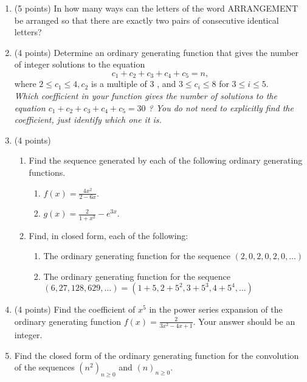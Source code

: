 \documentclass{article}
\begin{document}
\begin{enumerate}
  
  \item (5 points) In how many ways can the letters of the word ARRANGEMENT be arranged so that there are exactly two pairs of consecutive identical letters?
  \begin{answer}
  \end{answer}



  \item (4 points) Determine an ordinary generating function 
  that gives the number of integer solutions to the equation
$$
c_1+c_2+c_3+c_4+c_5=n,
$$
where $2 \leq c_1 \leq 4, c_2$ is a multiple of 3 , and $3 \leq c_i \leq 8$ for $3 \leq i \leq 5$.\\
\textit{Which coefficient in your function gives the number of solutions to the equation $c_1+c_2+c_3+c_4+c_5=30$ ? You do not need to explicitly find the coefficient, just identify which one it is.}
  \item (4 points) 
  \begin{enumerate}
    \item Find the sequence generated by each of the following ordinary generating functions.
    \begin{enumerate}
        \item $f(x)=\frac{4 x^2}{2-6 x}$.
        \item $g(x)=\frac{2}{1+x^2}-e^{3 x}$.
    \end{enumerate}
    \item Find, in closed form, each of the following:
    \begin{enumerate}
        \item The ordinary generating function for the sequence $(2,0,2,0,2,0, \ldots)$
        \item The ordinary generating function for the sequence 
        $(6,27,128,629, \ldots)=\left(1+5,2+5^2, 3+5^3, 4+5^4, \ldots\right)$
    \end{enumerate}
  \end{enumerate}
  \item (4 points) Find the coefficient of $x^5$ in the power series expansion of the ordinary generating function $f(x)= \frac{2}{3 x^2-4 x+1}$. Your answer should be an integer.
  \item Find the closed form of the ordinary generating function for the convolution of the sequences $\left(n^2\right)_{n \geq 0}$ and $(n)_{n \geq 0}$.






















\end{enumerate}
\end{document}
